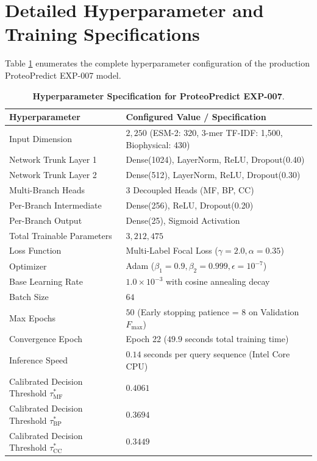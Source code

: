 \documentclass[10pt]{article}
\begin{document}
\section{Detailed Hyperparameter and Training Specifications}

Table \ref{tab:hyperparams} enumerates the complete hyperparameter configuration of the production ProteoPredict EXP-007 model.

\begin{table}[h!]
\centering
\caption{\textbf{Hyperparameter Specification for ProteoPredict EXP-007}.}
\label{tab:hyperparams}
\begin{tabular}{ll}
\toprule
\textbf{Hyperparameter} & \textbf{Configured Value / Specification} \\
\midrule
Input Dimension & $2,250$ (ESM-2: 320, 3-mer TF-IDF: 1,500, Biophysical: 430) \\
Network Trunk Layer 1 & Dense(1024), LayerNorm, ReLU, Dropout(0.40) \\
Network Trunk Layer 2 & Dense(512), LayerNorm, ReLU, Dropout(0.30) \\
Multi-Branch Heads & 3 Decoupled Heads (MF, BP, CC) \\
Per-Branch Intermediate & Dense(256), ReLU, Dropout(0.20) \\
Per-Branch Output & Dense(25), Sigmoid Activation \\
Total Trainable Parameters & $3,212,475$ \\
Loss Function & Multi-Label Focal Loss ($\gamma = 2.0, \alpha = 0.35$) \\
Optimizer & Adam ($\beta_1 = 0.9, \beta_2 = 0.999, \epsilon = 10^{-7}$) \\
Base Learning Rate & $1.0 \times 10^{-3}$ with cosine annealing decay \\
Batch Size & $64$ \\
Max Epochs & $50$ (Early stopping patience = 8 on Validation $F_{\max}$) \\
Convergence Epoch & Epoch 22 ($49.9$ seconds total training time) \\
Inference Speed & $0.14$ seconds per query sequence (Intel Core CPU) \\
Calibrated Decision Threshold $\tau^*_{\text{MF}}$ & $0.4061$ \\
Calibrated Decision Threshold $\tau^*_{\text{BP}}$ & $0.3694$ \\
Calibrated Decision Threshold $\tau^*_{\text{CC}}$ & $0.3449$ \\
\bottomrule
\end{tabular}
\end{table}
\end{document}
